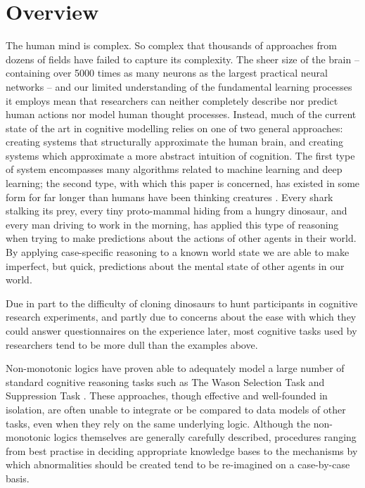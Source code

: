 \documentclass[
11pt, %
english, %
singlespacing, %
headsepline, %
]{MastersDoctoralThesis} %
\begin{document}
\section{Overview} \label{sec:overview}
The human mind is complex. So complex that thousands of approaches from dozens of fields have failed to capture its complexity. The sheer size of the brain -- containing  over 5000 times as many neurons as the largest practical neural networks \citep{mocanu2018scalable} -- and our limited understanding of the fundamental learning processes it employs mean that researchers can neither completely describe nor predict human actions nor model human thought processes. Instead, much of the current state of the art in cognitive modelling relies on one of two general approaches: creating systems that structurally approximate the human brain, and creating systems which approximate a more abstract intuition of cognition. The first type of system encompasses many algorithms related to machine learning and deep learning; the second type, with which this paper is concerned, has existed in some form for far longer than humans have been thinking creatures \citep{smirnova2015crows}. Every shark stalking its prey, every tiny proto-mammal hiding from a hungry dinosaur, and every man driving to work in the morning, has applied this type of reasoning when trying to make predictions about the actions of other agents in their world. By applying case-specific reasoning to a known world state we are able to make imperfect, but quick, predictions about the mental state of other agents in our world.

Due in part to the difficulty of cloning dinosaurs to hunt participants in cognitive research experiments, and partly due to concerns about the ease with which they could answer questionnaires on the experience later, most cognitive tasks used by researchers tend to be more dull than the examples above.

Non-monotonic logics have proven able to adequately model a large number of standard cognitive reasoning tasks such as The Wason Selection Task\citep{wason1968reasoning} and Suppression Task \citep{byrne1989suppressing}. These approaches, though effective and well-founded in isolation, are often unable to integrate or be compared to data models of other tasks, even when they rely on the same underlying logic. Although the non-monotonic logics themselves are generally carefully described, procedures ranging from best practise in deciding appropriate knowledge bases to the mechanisms by which abnormalities should be created tend to be re-imagined on a case-by-case basis.
\end{document}

